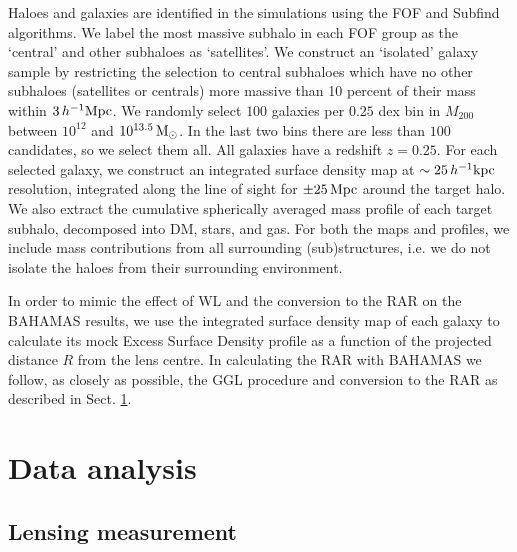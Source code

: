 \documentclass[usenatbib]{mnras}
\newcommand{\hkpc}{\, h^{-1}{\rm{kpc}} }
\newcommand{\hMpc}{\, h^{-1}{\rm{Mpc}} }
\begin{document}
Haloes and galaxies are identified in the simulations using the FOF \citep{davis1985} and Subfind \citep{springel2001,dolag2009} algorithms. We label the most massive subhalo in each FOF group as the `central' and other subhaloes as `satellites'. We construct an `isolated' galaxy sample by restricting the selection to central subhaloes which have no other subhaloes (satellites or centrals) more massive than 10 percent of their mass within $3 \hMpc$. We randomly select $100$ galaxies per $0.25$ dex bin in $M_{200}$ between $10^{12}$ and $10^{13.5}\,{\rm M}_\odot$. In the last two bins there are less than $100$ candidates, so we select them all. All galaxies have a redshift $z=0.25$. For each selected galaxy, we construct an integrated surface density map at $\sim 25\hkpc$ resolution, integrated along the line of sight for $\pm 25\,{\rm Mpc}$ around the target halo. We also extract the cumulative spherically averaged mass profile of each target subhalo, decomposed into DM, stars, and gas. For both the maps and profiles, we include mass contributions from all surrounding (sub)structures, i.e. we do not isolate the haloes from their surrounding environment.

In order to mimic the effect of WL and the conversion to the RAR on the BAHAMAS results, we use the integrated surface density map of each galaxy to calculate its mock Excess Surface Density profile as a function of the projected distance $R$ from the lens centre. In calculating the RAR with BAHAMAS we follow, as closely as possible, the GGL procedure and conversion to the RAR as described in Sect. \ref{sec:analysis}.


\section{Data analysis}
\label{sec:analysis}

\subsection{Lensing measurement}
\label{sec:lensing}
\end{document}
